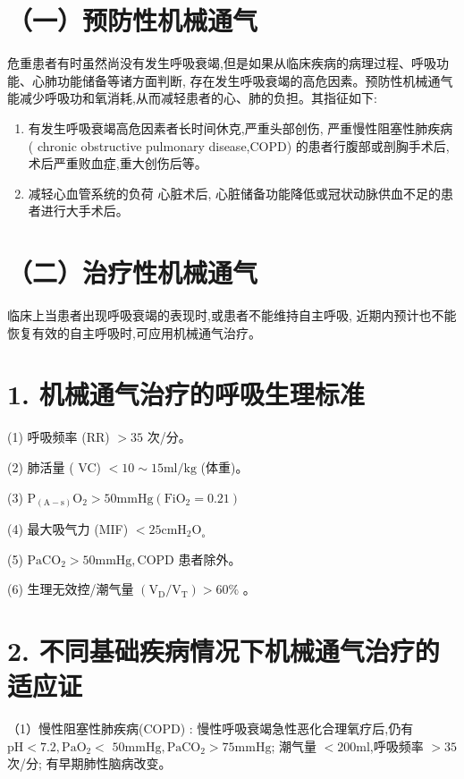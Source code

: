 \documentclass[10pt]{article}
\begin{document}
\section*{（一）预防性机械通气}
危重患者有时虽然尚没有发生呼吸衰竭,但是如果从临床疾病的病理过程、呼吸功能、心肺功能储备等诸方面判断, 存在发生呼吸衰竭的高危因素。预防性机械通气能减少呼吸功和氧消耗,从而减轻患者的心、肺的负担。其指征如下:

\begin{enumerate}
  \item 有发生呼吸衰竭高危因素者长时间休克,严重头部创伤, 严重慢性阻塞性肺疾病 ( chronic obstructive pulmonary disease,COPD) 的患者行腹部或剖胸手术后,术后严重败血症,重大创伤后等。

  \item 减轻心血管系统的负荷 心脏术后, 心脏储备功能降低或冠状动脉供血不足的患者进行大手术后。

\end{enumerate}

\section*{（二）治疗性机械通气}
临床上当患者出现呼吸衰竭的表现时,或患者不能维持自主呼吸, 近期内预计也不能恢复有效的自主呼吸时,可应用机械通气治疗。

\section*{1. 机械通气治疗的呼吸生理标准}
(1) 呼吸频率 (RR) $>35$ 次/分。

(2) 肺活量 ( VC) $<10 \sim 15 \mathrm{ml} / \mathrm{kg}$ (体重)。

(3) $\mathrm{P}_{(\mathrm{A}-\mathrm{s})} \mathrm{O}_{2}>50 \mathrm{mmHg}\left(\mathrm{FiO}_{2}=0.21\right)$

(4) 最大吸气力 (MIF) $<25 \mathrm{cmH}_{2} \mathrm{O}_{\text {。 }}$

(5) $\mathrm{PaCO}_{2}>50 \mathrm{mmHg}, \mathrm{COPD}$ 患者除外。

(6) 生理无效控/潮气量 $\left(\mathrm{V}_{\mathrm{D}} / \mathrm{V}_{\mathrm{T}}\right)>60 \%$ 。

\section*{2. 不同基础疾病情况下机械通气治疗的适应证}
（1）慢性阻塞性肺疾病(COPD) : 慢性呼吸衰竭急性恶化合理氧疗后,仍有 $\mathrm{pH}<7.2, \mathrm{PaO}_{2}<$ $50 \mathrm{mmHg}, \mathrm{PaCO}_{2}>75 \mathrm{mmHg}$; 潮气量 $<200 \mathrm{ml}$,呼吸频率 $>35$ 次/分; 有早期肺性脑病改变。
\end{document}
